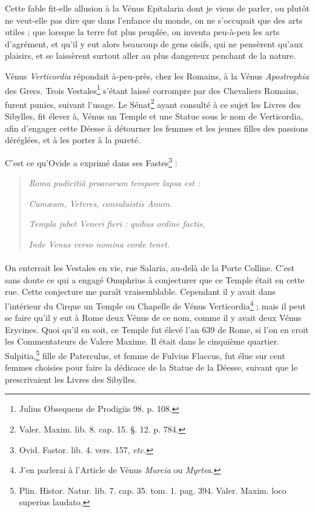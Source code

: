 \documentclass[a4paper, 18pt, oneside]{article}
\begin{document}
Cette fable fit-elle allusion à la Vénus Epitalaria dont je viens de parler, ou plutôt ne veut-elle pas dire que dans l'enfance du monde, on ne s'occupait que des arts utiles ; que lorsque la terre fut plus peuplée, on inventa peu-à-peu les arts d'agrément, et qu'il y eut alors beaucoup de gens oisifs, qui ne pensèrent qu'aux plaisirs, et se laissèrent surtout aller au plus dangereux penchant de la nature.

Vénus \emph{Verticordia} répondait à-peu-près, chez les Romains, à la Vénus \emph{Apostrophia} des Grecs. Trois Vestales\footnote{Julius Obsequens de Prodigiis 98. p. 108.} s'étant laissé corrompre par des Chevaliers Romains, furent punies, suivant l'usage. Le Sénat\footnote{Valer. Maxim. lib. 8. cap. 15. §. 12. p. 784.} ayant consulté à ce sujet les Livres des Sibylles, fit élever à, Vénus un Temple et une Statue sous le nom de Verticordia, afin d'engager cette Déesse à détourner les femmes et les jeunes filles des passions déréglées, et à les porter à la pureté.

C'est ce qu'Ovide a exprimé dans ses Fastes\footnote{Ovid. Fastor. lib. 4. vers. 157, \emph{etc.}} :
\begin{quotation}
\emph{Roma pudicitiâ proavorum tempore lapsa est :}

\hspace*{5mm}\emph{Cumæam, Veteres, consuluistis Anum.}

\emph{Templa jubet Veneri fieri : quibus ordine factis,}

\hspace*{5mm}\emph{Inde Venus verso nomina corde tenet.}
\end{quotation}
\paragraph{}
On enterrait les Vestales en vie, rue Salaria, au-delà de la Porte Colline. C'est sans doute ce qui a engagé Onuphrius à conjecturer que ce Temple était en cette rue. Cette conjecture me paraît vraisemblable. Cependant il y avait dans l'intérieur du Cirque un Temple ou Chapelle de Vénus Verticordia\footnote{J'en parlerai à l'Article de Vénus \emph{Murcia} ou \emph{Myrtea}.} ; mais il peut se faire qu'il y eut à Rome deux Vénus de ce nom, comme il y avait deux Vénus Erycines. Quoi qu'il en soit, ce Temple fut élevé l'an 639 de Rome, si l'on en croit les Commentateurs de Valere Maxime. Il était dans le cinquième quartier. Sulpitia,\footnote{Plin. Histor. Natur. lib. 7. cap. 35. tom. 1. pag. 394. Valer. Maxim. loco superius laudato.} fille de Paterculus, et femme de Fulvius Flaccus, fut élue sur cent femmes choisies pour faire la dédicace de la Statue de la Déesse, suivant que le prescrivaient les Livres des Sibylles.
\end{document}
